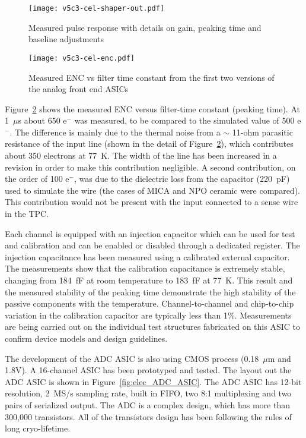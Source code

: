 \begin{figure}[htbp]
\centering
\texttt{[image: v5c3-cel-shaper-out.pdf]}
\caption[Measured pulse response with details]{Measured pulse response with details on gain, peaking time and baseline adjustments}
\label{fig:ce_elec_shaper_out}
\end{figure}

\begin{figure}[htbp]
\centering
\texttt{[image: v5c3-cel-enc.pdf]}
\caption[Measured ENC vs filter time constant]{Measured ENC vs filter time constant from the first two versions of the analog front end ASICs}
\label{fig:ce_elec_enc}
\end{figure}

Figure~\ref{fig:ce_elec_enc} shows the measured ENC versus filter-time constant (peaking time).
At 1~$\mu$s about 650 e$^{-}$ was measured, to be compared to the simulated value of 500 e$^{-}$.
The difference is mainly due to the thermal noise from a $\sim$ 11-ohm parasitic resistance of the input
line (shown in the detail of Figure~\ref{fig:ce_elec_enc}), which contributes about 350 electrons at 77~K.
The width of the line has been increased in a revision in order to make this contribution negligible.
A second contribution, on the order of 100 e$^{-}$,
was due to the dielectric loss from the capacitor (220~pF) used to simulate the wire
(the cases of MICA and NPO ceramic were compared).
This contribution would not be present with the input connected to a sense wire in the TPC.

Each channel is equipped with an injection capacitor which can be used
for test and calibration and can be enabled or disabled through a
dedicated register. The injection capacitance has been measured using 
a calibrated external capacitor. The measurements show
that the calibration capacitance is extremely stable, changing from
184~fF at room temperature to 183~fF at 77~K. This result and the measured
stability of the peaking time demonstrate the high stability of the
passive components with the temperature. Channel-to-channel and chip-to-chip
variation in the calibration capacitor are typically less than 1\%. Measurements are being carried
out on the individual test structures fabricated on this ASIC to
confirm device models and design guidelines.

The development of the ADC ASIC is also using CMOS process (0.18~$\mu$m and 1.8V).
A 16-channel ASIC has been prototyped and tested.
The layout out the ADC ASIC is shown in Figure~\ref{fig:elec_ADC_ASIC}. 
The ADC ASIC has 12-bit resolution, 2~MS/s sampling rate, built in FIFO, two 8:1 multiplexing and two pairs of serialized output.
The ADC is a complex design, which has more than 300,000 transistors.
All of the transistors design has been following the rules of long cryo-lifetime.

